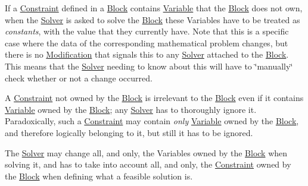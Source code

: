 \begin{DoxyItemize}
\item If a \mbox{\hyperlink{class_s_m_spp__di__unipi__it_1_1_constraint}{Constraint}} defined in a \mbox{\hyperlink{class_s_m_spp__di__unipi__it_1_1_block}{Block}} contains \mbox{\hyperlink{class_s_m_spp__di__unipi__it_1_1_variable}{Variable}} that the \mbox{\hyperlink{class_s_m_spp__di__unipi__it_1_1_block}{Block}} does not own, when the \mbox{\hyperlink{class_s_m_spp__di__unipi__it_1_1_solver}{Solver}} is asked to solve the \mbox{\hyperlink{class_s_m_spp__di__unipi__it_1_1_block}{Block}} these Variables have to be treated as {\itshape constants}, with the value that they currently have. Note that this is a specific case where the data of the corresponding mathematical problem changes, but there is no \mbox{\hyperlink{class_s_m_spp__di__unipi__it_1_1_modification}{Modification}} that signals this to any \mbox{\hyperlink{class_s_m_spp__di__unipi__it_1_1_solver}{Solver}} attached to the \mbox{\hyperlink{class_s_m_spp__di__unipi__it_1_1_block}{Block}}. This means that the \mbox{\hyperlink{class_s_m_spp__di__unipi__it_1_1_solver}{Solver}} needing to know about this will have to \char`\"{}manually\char`\"{} check whether or not a change occurred.
\item A \mbox{\hyperlink{class_s_m_spp__di__unipi__it_1_1_constraint}{Constraint}} not owned by the \mbox{\hyperlink{class_s_m_spp__di__unipi__it_1_1_block}{Block}} is irrelevant to the \mbox{\hyperlink{class_s_m_spp__di__unipi__it_1_1_block}{Block}} even if it contains \mbox{\hyperlink{class_s_m_spp__di__unipi__it_1_1_variable}{Variable}} owned by the \mbox{\hyperlink{class_s_m_spp__di__unipi__it_1_1_block}{Block}}; any \mbox{\hyperlink{class_s_m_spp__di__unipi__it_1_1_solver}{Solver}} has to thoroughly ignore it. Paradoxically, such a \mbox{\hyperlink{class_s_m_spp__di__unipi__it_1_1_constraint}{Constraint}} may contain {\itshape only} \mbox{\hyperlink{class_s_m_spp__di__unipi__it_1_1_variable}{Variable}} owned by the \mbox{\hyperlink{class_s_m_spp__di__unipi__it_1_1_block}{Block}}, and therefore logically belonging to it, but still it has to be ignored.
\item The \mbox{\hyperlink{class_s_m_spp__di__unipi__it_1_1_solver}{Solver}} may change all, and only, the Variables owned by the \mbox{\hyperlink{class_s_m_spp__di__unipi__it_1_1_block}{Block}} when solving it, and has to take into account all, and only, the \mbox{\hyperlink{class_s_m_spp__di__unipi__it_1_1_constraint}{Constraint}} owned by the \mbox{\hyperlink{class_s_m_spp__di__unipi__it_1_1_block}{Block}} when defining what a feasible solution is.
\end{DoxyItemize}

